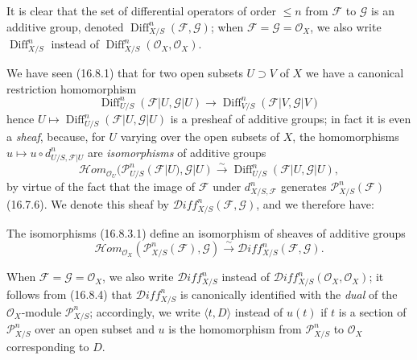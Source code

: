 \begin{env}[16.8.3]
\label{IV.16.8.3}
It is clear that the set of differential operators of order $\leq n$ from
$\mathscr{F}$ to $\mathscr{G}$ is an additive group, denoted
$\operatorname{Diff}_{X/S}^n(\mathscr{F},\mathscr{G})$; when
$\mathscr{F}=\mathscr{G}=\mathcal{O}_X$, we also write
$\operatorname{Diff}_{X/S}^n$ instead of
$\operatorname{Diff}_{X/S}^n(\mathcal{O}_X,\mathcal{O}_X)$.

We have seen (16.8.1) that for two open subsets $U\supset V$ of $X$ we have
a canonical restriction homomorphism
\[
  \operatorname{Diff}_{U/S}^n(\mathscr{F}|U,\mathscr{G}|U)
  \longrightarrow
  \operatorname{Diff}_{V/S}^n(\mathscr{F}|V,\mathscr{G}|V)
\]
hence $U\mapsto\operatorname{Diff}_{U/S}^n(\mathscr{F}|U,\mathscr{G}|U)$ is
a presheaf of additive groups; in fact it is even a \emph{sheaf}, because,
for $U$ varying over the open subsets of $X$, the homomorphisms
$u\mapsto u\circ d_{U/S,\mathscr{F}|U}^n$ are \emph{isomorphisms} of
additive groups
\[
  \mathscr{H}\!om_{\mathcal{O}_U}
  (\mathscr{P}_{U/S}^n(\mathscr{F}|U),\mathscr{G}|U)
  \xrightarrow{\sim}
  \operatorname{Diff}_{U/S}^n(\mathscr{F}|U,\mathscr{G}|U),
  \tag{16.8.3.1}
  \label{IV.16.8.3.1}
\]
by virtue of the fact that the image of $\mathscr{F}$ under
$d_{X/S,\mathscr{F}}^n$ generates $\mathscr{P}_{X/S}^n(\mathscr{F})$
(16.7.6). We denote this sheaf by
$\mathscr{D}\!iff_{X/S}^n(\mathscr{F},\mathscr{G})$, and we therefore have:
\end{env}

\begin{proposition}[16.8.4]
\label{IV.16.8.4}
The isomorphisms (16.8.3.1) define an isomorphism of sheaves of
additive groups
\[
  \mathscr{H}\!om_{\mathcal{O}_X}
  (\mathscr{P}_{X/S}^n(\mathscr{F}),\mathscr{G})
  \xrightarrow{\sim}
  \mathscr{D}\!iff_{X/S}^n(\mathscr{F},\mathscr{G}).
  \tag{16.8.4.1}
  \label{IV.16.8.4.1}
\]
\end{proposition}

When $\mathscr{F}=\mathscr{G}=\mathcal{O}_X$, we also write
$\mathscr{D}\!iff_{X/S}^n$ instead of
$\mathscr{D}\!iff_{X/S}^n(\mathcal{O}_X,\mathcal{O}_X)$; it follows from
(16.8.4) that $\mathscr{D}\!iff_{X/S}^n$ is canonically identified with the
\emph{dual} of the $\mathcal{O}_X$-module $\mathscr{P}_{X/S}^n$; accordingly,
we write $\langle t,D\rangle$ instead of $u(t)$ if $t$ is a section of
$\mathscr{P}_{X/S}^n$ over an open subset and $u$ is the homomorphism from
$\mathscr{P}_{X/S}^n$ to $\mathcal{O}_X$ corresponding to $D$.

